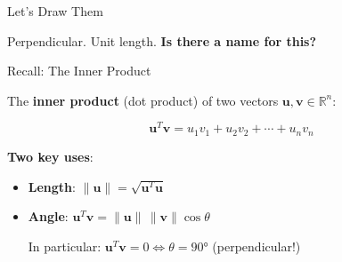 \documentclass[10pt]{beamer}
\theoremstyle{definition}
\newcommand{\x}[1]{\alert{\textbf{#1}}}
\begin{document}
\begin{frame}{Let's Draw Them}
\vspace{0.3em}

Perpendicular. Unit length. \quad \x{Is there a name for this?}

\end{frame}

%

\begin{frame}{Recall: The Inner Product}

The \x{inner product} (dot product) of two vectors $\mathbf{u}, \mathbf{v} \in \mathbb{R}^n$:

$$\mathbf{u}^T \mathbf{v} = u_1 v_1 + u_2 v_2 + \cdots + u_n v_n$$

\vspace{0.3em}

\x{Two key uses}:

\vspace{0.3em}

\begin{itemize}
\item \x{Length}: $\|\mathbf{u}\| = \sqrt{\mathbf{u}^T \mathbf{u}}$

\vspace{0.3em}

\item \x{Angle}: $\mathbf{u}^T \mathbf{v} = \|\mathbf{u}\| \, \|\mathbf{v}\| \cos\theta$

\vspace{0.3em}

In particular: $\mathbf{u}^T \mathbf{v} = 0 \iff \theta = 90°$ \quad (perpendicular!)
\end{itemize}

\end{frame}
\end{document}
